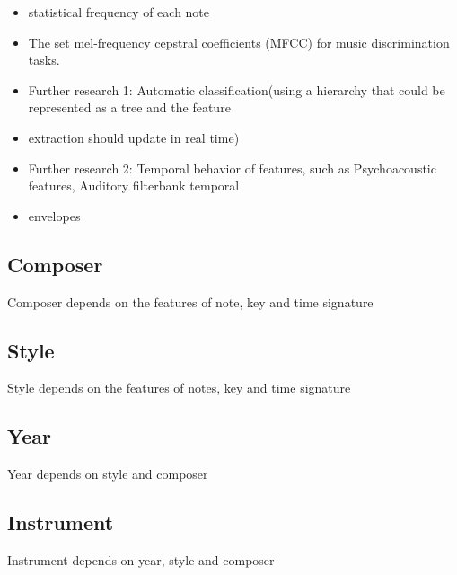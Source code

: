 \documentclass[a4paper,12pt]{article}
\begin{document}
\begin{itemize}
    \item statistical frequency of each note 
    \item The set mel-frequency cepstral coefficients (MFCC) for music discrimination tasks.
    \item Further research 1: Automatic classification(using a hierarchy that could be represented as a tree and the feature
    \item extraction should update in real time)
    \item Further research 2: Temporal behavior of features, such as Psychoacoustic features, Auditory filterbank temporal       
    \item envelopes
\end{itemize}

\subsection{Composer}

Composer depends on the features of note, key and time signature

\subsection{Style}

Style depends on the features of notes, key and time signature

\subsection{Year}

Year depends on style and composer

\subsection{Instrument}

Instrument depends on year, style and composer


\end{document}
